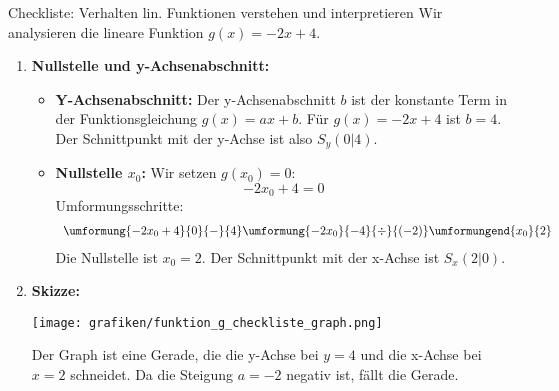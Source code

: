 \begin{loesungsumgebung}{Checkliste: Verhalten lin. Funktionen verstehen und interpretieren}
Wir analysieren die lineare Funktion $g(x) = -2x + 4$.

\begin{enumerate}[label=(\alph*)]
    \item \textbf{Nullstelle und y-Achsenabschnitt:}
    \begin{itemize}
        \item \textbf{Y-Achsenabschnitt:} Der y-Achsenabschnitt $b$ ist der konstante Term in der Funktionsgleichung $g(x) = ax+b$. Für $g(x) = -2x + 4$ ist $b = 4$. Der Schnittpunkt mit der y-Achse ist also $S_y(0|4)$.
        \item \textbf{Nullstelle $x_0$:} Wir setzen $g(x_0)=0$:
        $$ -2x_0 + 4 = 0 $$
        Umformungsschritte:
        $$
        \begin{array}{r c l c l}
        \umformung{-2x_0 + 4}{0}{-}{4}
        \umformung{-2x_0}{-4}{\div}{(-2)}
        \umformungend{x_0}{2}
        \end{array}
        $$
        Die Nullstelle ist $x_0 = 2$. Der Schnittpunkt mit der x-Achse ist $S_x(2|0)$.
    \end{itemize}

    \item \textbf{Skizze:}
    \begin{center}
    \texttt{[image: grafiken/funktion\_g\_checkliste\_graph.png]}
    \label{fig:g_checkliste_graph}
    \end{center}
    Der Graph ist eine Gerade, die die y-Achse bei $y=4$ und die x-Achse bei $x=2$ schneidet. Da die Steigung $a=-2$ negativ ist, fällt die Gerade.


\end{enumerate}
\end{loesungsumgebung}
